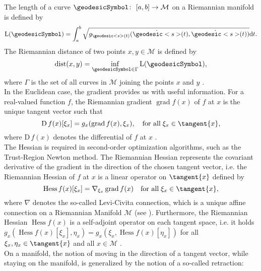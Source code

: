 The length of a curve $\geodesicSymbol \colon \ [a,b] \to \mathcal{M}$ on a Riemannian manifold is defined by
\begin{equation*}
    \mathrm{L}(\geodesicSymbol) = \int^{b}_a \sqrt{ g_{\geodesic<s>(t)} (\dot{\geodesic<s>}(t), \dot{\geodesic<s>}(t)) } \mathrm{d}t.
\end{equation*}
The Riemannian distance of two points $x,y \in \mathcal{M}$ is defined by
\begin{equation*}
    \operatorname{dist}(x,y) = \inf_{\geodesicSymbol \in \Gamma} \mathrm{L}(\geodesicSymbol),
\end{equation*}
where $\Gamma$ is the set of all curves in $\mathcal{M}$ joining the points $x$ and $y$ \cite[p.~46]{AbsilMahonySepulchre:2008}. \\
In the Euclidean case, the gradient provides us with useful information. For a real-valued function $f$, the Riemannian gradient $\operatorname{grad} f(x)$ of $f$ at $x$ is the unique tangent vector such that
\begin{equation*}
    \mathrm{D} \, f(x) [\xi_x] = g_x (\operatorname{grad} f(x), \xi_x), \quad \text{for all} \; \xi_x \in \tangent{x},
\end{equation*}
where $\mathrm{D} \, f(x)$ denotes the differential of $f$ at $x$ \cite[p.~46]{AbsilMahonySepulchre:2008}. \\
The Hessian is required in second-order optimization algorithms, such as the Trust-Region Newton method. The Riemannian Hessian represents the covariant derivative of the gradient in the direction of the chosen tangent vector, i.e. the Riemannian Hessian of $f$ at $x$ is a linear operator on $\tangent{x}$ defined by
\begin{equation*}
    \operatorname{Hess} f(x) [\xi_{x}] = \nabla_{\xi_{x}} \operatorname{grad} f(x) \quad \text{for all} \; \xi_x \in \tangent{x},
\end{equation*}
where $\nabla$ denotes the so-called Levi-Civita connection, which is a unique affine connection on a Riemannian Manifold $\mathcal{M}$ (see \cite[Theorem~5.3.1~(Levi-Civita)]{AbsilMahonySepulchre:2008}). Furthermore, the Riemannian Hessian $\operatorname{Hess} f(x)$ is a self-adjoint operator on each tangent space, i.e. it holds $g_x(\operatorname{Hess} f(x) [\xi_{x}], \eta_x) = g_x(\xi_{x}, \operatorname{Hess} f(x) [\eta_x])$ for all $\xi_x, \eta_x \in \tangent{x}$ and all $x \in \mathcal{M}$ \cite[p.~105]{AbsilMahonySepulchre:2008}. \\
On a manifold, the notion of moving in the direction of a tangent vector, while staying on the manifold, is generalized by the notion of a so-called retraction:
